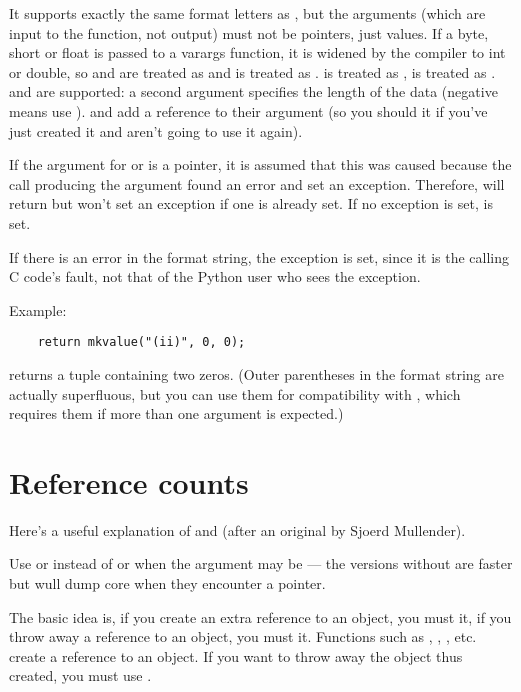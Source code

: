 It supports exactly the same format letters as , but
the arguments (which are input to the function, not output) must not
be pointers, just values.  If a byte, short or float is passed to a
varargs function, it is widened by the compiler to int or double, so
 and  are treated as  and  is
treated as .   is treated as ,  is
treated as .   and  are supported: a
second argument specifies the length of the data (negative means use
).   and  add a reference to their
argument (so you should  it if you've just created it
and aren't going to use it again).

If the argument for  or  is a  pointer, it is
assumed that this was caused because the call producing the argument
found an error and set an exception.  Therefore,  will
return  but won't set an exception if one is already set.
If no exception is set,  is set.

If there is an error in the format string, the 
exception is set, since it is the calling C code's fault, not that of
the Python user who sees the exception.

Example:

\begin{verbatim}
    return mkvalue("(ii)", 0, 0);
\end{verbatim}

returns a tuple containing two zeros.  (Outer parentheses in the
format string are actually superfluous, but you can use them for
compatibility with , which requires them if more than
one argument is expected.)


\section{Reference counts}

Here's a useful explanation of  and 
(after an original by Sjoerd Mullender).

Use  or  instead of  or
 when the argument may be  --- the versions
without  are faster but wull dump core when they encounter a
 pointer.

The basic idea is, if you create an extra reference to an object, you
must  it, if you throw away a reference to an object,
you must  it.  Functions such as
, ,
, etc. create a reference to an object.  If you
want to throw away the object thus created, you must use
.

